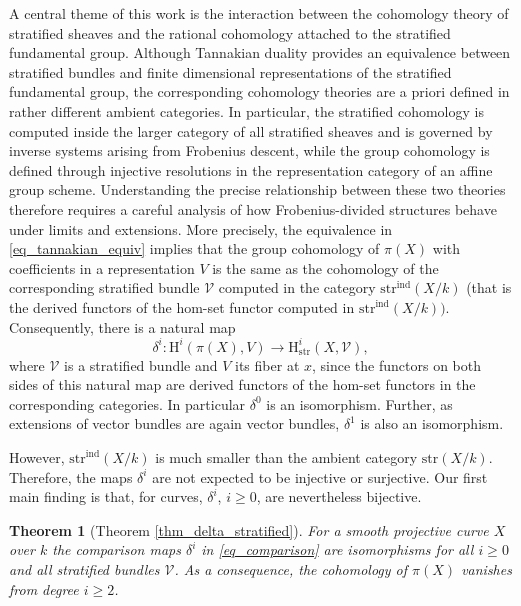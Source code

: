 \documentclass[12pt,a4]{amsart}
\newtheorem{theorem}{Theorem}
\theoremstyle{definition}
\begin{document}
A central theme of this work is the interaction between the  cohomology theory of stratified sheaves and the rational cohomology attached to the stratified fundamental group. Although Tannakian duality provides an equivalence between stratified bundles and finite dimensional representations of the stratified fundamental group, the corresponding cohomology theories are a priori defined in rather different ambient categories. In particular, the stratified cohomology is computed inside the larger category of all stratified sheaves and is governed by inverse systems arising from Frobenius descent, while the group cohomology is defined through injective resolutions in the representation category of an affine group scheme. Understanding the precise relationship between these two theories therefore requires a careful analysis of how Frobenius-divided structures behave under limits and extensions. More precisely, the equivalence in \eqref{eq_tannakian_equiv} 
implies that the group cohomology of $\pi(X)$ with coefficients in a representation $V$ is the same
as the cohomology of the corresponding stratified bundle $\mathcal V$ computed in the category 
$\mathrm{str}^\mathrm{ind}(X/k)$ (that is the derived functors of the hom-set functor computed in
$\mathrm{str}^\mathrm{ind}(X/k))$. 
Consequently, there is a natural map
\begin{equation}\label{eq_comparison}
\delta^i:\mathrm{H}^i(\pi(X),V)\longrightarrow 
\mathrm{H}^i_\mathrm{str}(X,\mathcal V),
\end{equation}
where $\mathcal V$ is a stratified bundle and $V$ its fiber at $x$, since the functors on both sides of
this natural map are derived functors of the hom-set functors in the corresponding categories. In
particular $\delta^0$ is an isomorphism. Further, as extensions of vector bundles are again vector bundles,
$\delta^1$ is also an isomorphism. 


However, $\mathrm{str}^\mathrm{ind}(X/k)$
is much smaller than
the ambient category $\mathrm{str}(X/k)$. Therefore, the maps $\delta^i$ are not expected
to be injective or surjective. Our first main finding is that, for curves, 
$\delta^i$, $i\geq 0$, are nevertheless bijective. 
\begin{theorem}[Theorem \ref{thm_delta_stratified}]
For a smooth projective curve $X$ over $k$ the comparison maps $\delta^i$ in \eqref{eq_comparison} are isomorphisms for all $i\geq 0$
and all stratified bundles $\mathcal V$. As a consequence, the cohomology of $\pi(X)$ vanishes from
degree $i\geq 2$.
\end{theorem}
\end{document}
